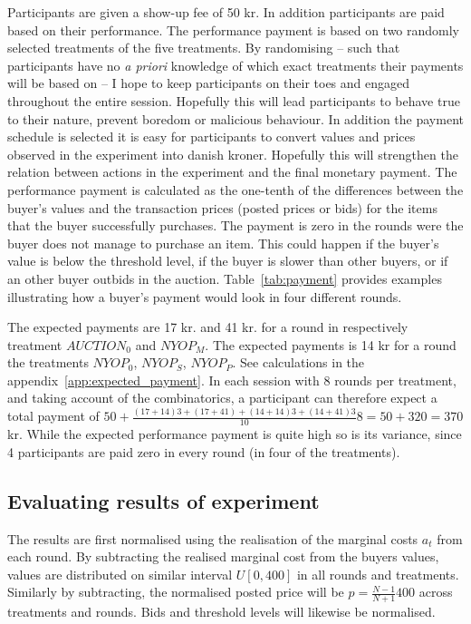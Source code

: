 \documentclass[a4paper,12pt]{article}
\begin{document}
	Participants are given a show-up fee of 50 kr. In addition participants are paid based on their performance. The performance payment is based on two randomly selected treatments of the five treatments. By randomising -- such that participants have no \emph{a priori} knowledge of which exact treatments their payments will be based on -- I hope to keep participants on their toes and engaged throughout the entire session. Hopefully this will lead participants to behave true to their nature, prevent boredom or malicious behaviour. In addition the payment schedule is selected it is easy for participants to convert values and prices observed in the experiment into danish kroner. Hopefully this will strengthen the relation between actions in the experiment and the final monetary payment. The performance payment is calculated as the one-tenth of the differences between the buyer's values and the transaction prices (posted prices or bids) for the items that the buyer successfully purchases. The payment is zero in the rounds were the buyer does not manage to purchase an item. This could happen if the buyer's value is below the threshold level, if the buyer is slower than other buyers, or if an other buyer outbids in the auction. Table~\ref{tab:payment} provides examples illustrating how a buyer's payment would look in four different rounds.
	
	The expected payments are 17 kr. and 41 kr. for a round in respectively treatment $AUCTION_0$ and $NYOP_M$. The expected payments is 14 kr for a round the treatments $NYOP_0$, $NYOP_S$, $NYOP_P$. See calculations in the appendix~\ref{app:expected_payment}. In each session with 8 rounds per treatment, and taking account of the combinatorics, a participant can therefore expect a total payment of $50 + \frac{(17+14)3 + (17+41) + (14+14)3 + (14+41)3}{10}8 = 50 + 320 = 370$ kr. While the expected performance payment is quite high so is its variance, since 4 participants are paid zero in every round (in four of the treatments).
	
	\subsection{Evaluating results of experiment}
	
	The results are first normalised using the realisation of the marginal costs $a_t$ from each round. By subtracting the realised marginal cost from the buyers values, values are distributed on similar interval $U[0,400]$ in all rounds and treatments. Similarly by subtracting, the normalised posted price will be $p = \frac{N-1}{N+1}400$ across treatments and rounds. Bids and threshold levels will likewise be normalised. 
\end{document}

